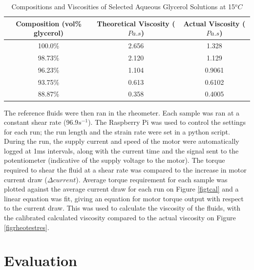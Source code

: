 \documentclass[twoside,a4]{report}
\begin{document}
		\begin{table}
			\centering
			\begin{tabular}{| c | c | c |}
				\hline
				Composition (vol\% glycerol) & Theoretical Viscosity ($Pa.s$) & Actual Viscosity ($Pa.s$)\\
				\hline
				100.0\% & 2.656 & 1.328 \\
				98.73\% & 2.120 & 1.129 \\
				96.23\% & 1.104 & 0.9061 \\
				93.75\% & 0.613 & 0.6102 \\
				88.87\% & 0.358 & 0.4005 \\
				\hline
			\end{tabular}
			\caption{Compositions and Viscosities of Selected Aqueous Glycerol Solutions at 15$^o C$}
			\label{tabreffluvisc}
		\end{table}
	\noindent
	\newline
	The reference fluids were then ran in the rheometer. Each sample was ran at a constant shear rate (96.9$s^{-1}$). The Raspberry Pi was used to control the settings for each run; the run length and the strain rate were set in a python script. During the run, the supply current and speed of the motor were automatically logged at 1ms intervals, along with the current time and the signal sent to the potentiometer (indicative of the supply voltage to the motor). The torque required to shear the fluid at a shear rate was compared to the increase in motor current draw ($\Delta current$). Average torque requirement for each sample was plotted against the average current draw for each run on Figure \ref{figtcal} and a linear equation was fit, giving an equation for motor torque output with respect to the current draw. This was used to calculate the viscosity of the fluids, with the calibrated calculated viscosity compared to the actual viscosity on Figure \ref{figrheotestres}.

	\section{Evaluation}
	
\end{document}
